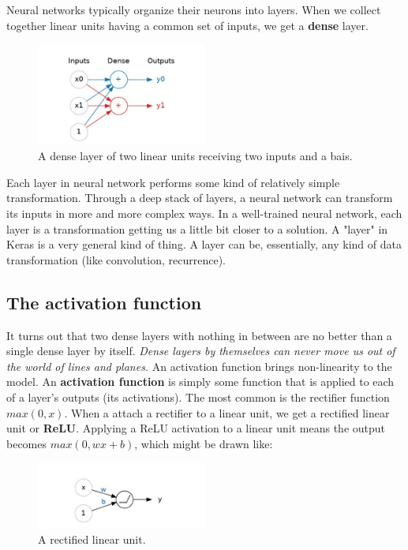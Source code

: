 \noindent Neural networks typically organize their neurons into layers.
When we collect together linear units having a common set of inputs, we
get a \textbf{dense} layer.

\begin{figure}[htp]
	\centering
	\includegraphics[width=0.5\textwidth]{../assets/machine_learning_random/denser_layer_with_two_inputs_and_a_bias.jpg}
	\caption{A dense layer of two linear units receiving two inputs and a bais.}
\end{figure}

\noindent Each layer in neural network performs some kind of relatively
simple transformation. Through a deep stack of layers, a neural network can
transform its inputs in more and more complex ways. In a well-trained
neural network, each layer is a transformation getting us a little bit
closer to a solution. A "layer" in Keras is a very general kind of thing.
A layer can be, essentially, any kind of data transformation (like
convolution, recurrence). 

\subsection{The activation function}
\noindent It turns out that two dense layers with nothing in between
are no better than a single dense layer by itself. \emph{Dense layers by
themselves can never move us out of the world of lines and planes.}
An activation function brings non-linearity to the model. An 
\textbf{activation function} is simply some function that is applied to
each of a layer's outputs (its activations). The most common is the
rectifier function $ max(0,x) $. When a attach a rectifier to a linear
unit, we get a rectified linear unit or \textbf{ReLU}. Applying a ReLU
activation to a linear unit means the output becomes $ max(0, wx + b) $,
which might be drawn like:

\begin{figure}[htp]
	\centering
	\includegraphics[width=0.5\textwidth]{../assets/machine_learning_random/rectified_linear_unit.jpg}
	\caption{A rectified linear unit.}
\end{figure}

